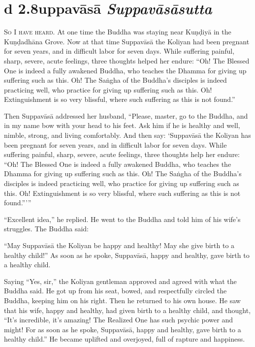 \documentclass[12pt,openany]{book}%
\newcommand*{\suttatitleacronym}[1]{\smaller[2]{#1}\vspace*{.3em}}
\newcommand*{\suttatitletranslation}[1]{\linebreak{#1}}
\newcommand*{\suttatitleroot}[1]{\linebreak\smaller[2]\itshape{#1}}
\newcommand*{\tocacronym}[1]{\hspace*{-3.3em}{#1}\quad}
\newcommand*{\toctranslation}[1]{#1}
\newcommand*{\tocroot}[1]{(\textit{#1})}
\newcommand*{\scevam}[1]{\textsc{#1}}
\begin{document}
%
\section*{{\suttatitleacronym Ud 2.8}{\suttatitletranslation Suppavāsā }{\suttatitleroot Suppavāsāsutta}}
\addcontentsline{toc}{section}{\tocacronym{Ud 2.8} \toctranslation{Suppavāsā } \tocroot{Suppavāsāsutta}}

\scevam{So I have heard. }At one time the Buddha was staying near \textsanskrit{Kuṇḍiyā} in the \textsanskrit{Kuṇḍadhāna} Grove. Now at that time \textsanskrit{Suppavāsā} the Koliyan had been pregnant for seven years, and in difficult labor for seven days. While suffering painful, sharp, severe, acute feelings, three thoughts helped her endure: “Oh! The Blessed One is indeed a fully awakened Buddha, who teaches the Dhamma for giving up suffering such as this. Oh! The \textsanskrit{Saṅgha} of the Buddha’s disciples is indeed practicing well, who practice for giving up suffering such as this. Oh! Extinguishment is so very blissful, where such suffering as this is not found.” 

Then \textsanskrit{Suppavāsā} addressed her husband, “Please, master, go to the Buddha, and in my name bow with your head to his feet. Ask him if he is healthy and well, nimble, strong, and living comfortably. And then say: ‘\textsanskrit{Suppavāsā} the Koliyan has been pregnant for seven years, and in difficult labor for seven days. While suffering painful, sharp, severe, acute feelings, three thoughts help her endure: “Oh! The Blessed One is indeed a fully awakened Buddha, who teaches the Dhamma for giving up suffering such as this. Oh! The \textsanskrit{Saṅgha} of the Buddha’s disciples is indeed practicing well, who practice for giving up suffering such as this. Oh! Extinguishment is so very blissful, where such suffering as this is not found.”’” 

“Excellent idea,” he replied. He went to the Buddha and told him of his wife’s struggles. The Buddha said: 

“May \textsanskrit{Suppavāsā} the Koliyan be happy and healthy! May she give birth to a healthy child!” As soon as he spoke, \textsanskrit{Suppavāsā}, happy and healthy, gave birth to a healthy child. 

Saying “Yes, sir,” the Koliyan gentleman approved and agreed with what the Buddha said. He got up from his seat, bowed, and respectfully circled the Buddha, keeping him on his right. Then he returned to his own house. He saw that his wife, happy and healthy, had given birth to a healthy child, and thought, “It’s incredible, it’s amazing! The Realized One has such psychic power and might! For as soon as he spoke, \textsanskrit{Suppavāsā}, happy and healthy, gave birth to a healthy child.” He became uplifted and overjoyed, full of rapture and happiness. 
\end{document}
